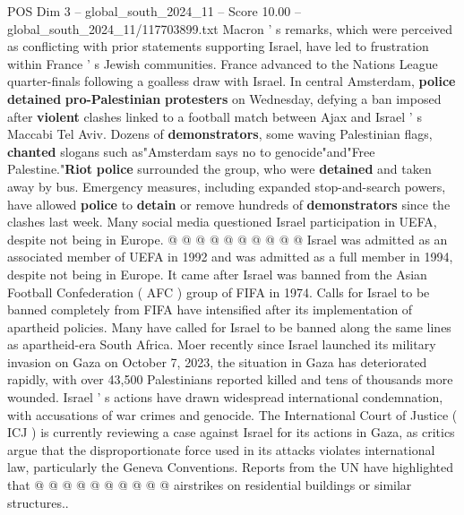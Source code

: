 \begin{textsample}{POS Dim 3 – global\_south\_2024\_11 – Score 10.00 – global\_south\_2024\_11/117703899.txt}
Macron ' s remarks, which were perceived as conflicting with prior statements supporting Israel, have led to frustration within France ' s Jewish communities.
France advanced to the Nations League quarter-finals following a goalless draw with Israel.
In central Amsterdam, \textbf{police} \textbf{detained} \textbf{pro-Palestinian} \textbf{protesters} on Wednesday, defying a ban imposed after \textbf{violent} clashes linked to a football match between Ajax and Israel ' s Maccabi Tel Aviv.
Dozens of \textbf{demonstrators}, some waving Palestinian flags, \textbf{chanted} slogans such as"Amsterdam says no to genocide"and"Free Palestine."\textbf{Riot} \textbf{police} surrounded the group, who were \textbf{detained} and taken away by bus.
Emergency measures, including expanded stop-and-search powers, have allowed \textbf{police} to \textbf{detain} or remove hundreds of \textbf{demonstrators} since the clashes last week.
Many social media questioned Israel participation in UEFA, despite not being in Europe. @ @ @ @ @ @ @ @ @ @ Israel was admitted as an associated member of UEFA in 1992 and was admitted as a full member in 1994, despite not being in Europe.
It came after Israel was banned from the Asian Football Confederation ( AFC ) group of FIFA in 1974.
Calls for Israel to be banned completely from FIFA have intensified after its implementation of apartheid policies.
Many have called for Israel to be banned along the same lines as apartheid-era South Africa.
Moer recently since Israel launched its military invasion on Gaza on October 7, 2023, the situation in Gaza has deteriorated rapidly, with over 43,500 Palestinians reported killed and tens of thousands more wounded.
Israel ' s actions have drawn widespread international condemnation, with accusations of war crimes and genocide.
The International Court of Justice ( ICJ ) is currently reviewing a case against Israel for its actions in Gaza, as critics argue that the disproportionate force used in its attacks violates international law, particularly the Geneva Conventions.
Reports from the UN have highlighted that @ @ @ @ @ @ @ @ @ @ airstrikes on residential buildings or similar structures..

\end{textsample}
